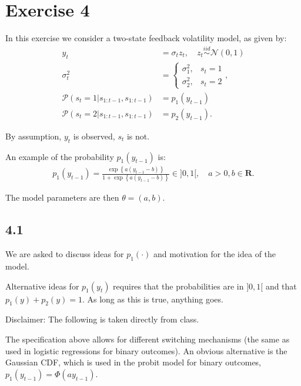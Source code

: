 \documentclass[11pt,a4paper,oneside]{article}
\newcommand{\lp}{\left(}
\newcommand{\rp}{\right)}
\newcommand{\lc}{\left\{}
\newcommand{\rc}{\right\}}
\newcommand{\pp}{\mathcal{P}}
\newcommand{\rr}{\mathbf{R}}
\newcommand{\nnn}{\mathcal{N}}
\newcommand{\iid}{\overset{iid}{\sim}}
\begin{document}
\clearpage

\section{Exercise 4}
\renewcommand{\theequation}{4.\arabic{equation}}
\setcounter{equation}{0}

In this exercise we consider a two-state feedback volatility model, as given by:
\begin{align}
    y_t 
        &= \sigma_t z_t, \quad z_t \iid \nnn\lp 0, 1\rp \\
    \sigma_t^2 
        &= \begin{cases} \sigma_1^2, & s_t = 1 \\ \sigma_2^2, & s_t = 2 \end{cases},\\
    \pp\lp s_t = 1 \vert s_{1:t-1}, s_{1:t-1} \rp 
        &= p_1\lp y_{t-1}\rp \\
    \pp\lp s_t = 2 \vert s_{1:t-1}, s_{1:t-1} \rp 
        &= p_2\lp y_{t-1}\rp.
\end{align}

By assumption, $y_t$ is observed, $s_t$ is not.

An example of the probability $p_1\lp y_{t-1}\rp$ is:
\begin{align}
    p_1\lp y_{t-1}\rp = \frac{\exp\lc  a \lp y_{t-1} - b\rp \rc}{1 + \exp\lc a \lp y_{t-1} - b \rp \rc}\in ]0, 1[, \quad a > 0, b \in \rr.
\end{align}

The model parameters are then $\theta = \lp a, b\rp$.

\subsection{4.1}
We are asked to discuss ideas for $p_1\lp \cdot\rp$ and motivation for the idea of the model.

Alternative ideas for $p_1\lp y_t\rp$ requires that the probabilities are in $]0, 1[$ and that $p_1\lp y\rp + p_2\lp y\rp = 1$. As long as this is true, anything goes.

Disclaimer: The following is taken directly from class.

The specification above allows for different switching mechanisms (the same as used in logistic regressions for binary outcomes). An obvious alternative is the Gaussian CDF, which is used in the probit model for binary outcomes, $p_1\lp y_{t-1}\rp = \Phi\lp a y_{t-1}\rp$.
\end{document}
